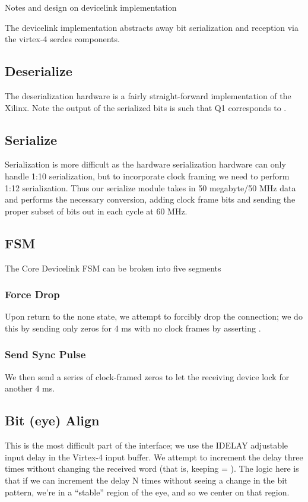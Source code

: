 Notes and design on devicelink implementation

The devicelink implementation abstracts away bit serialization and reception via the virtex-4 serdes components. 

\subsection{Deserialize}
The deserialization hardware is a fairly straight-forward implementation of the Xilinx. Note the output of the serialized bits is such that Q1 corresponds to . 

\subsection{Serialize}
Serialization is more difficult as the hardware serialization hardware
can only handle 1:10 serialization, but to incorporate clock framing
we need to perform 1:12 serialization. Thus our serialize module takes
in 50 megabyte/50 MHz data and performs the necessary conversion,
adding clock frame bits and sending the proper subset of bits out in
each cycle at 60 MHz.


\subsection{FSM} 
The Core Devicelink FSM can be broken into five segments

\subsubsection{Force Drop}
Upon return to the none state, we attempt to forcibly drop the
connection; we do this by sending only zeros for 4 ms with no clock
frames by asserting .

\subsubsection{Send Sync Pulse}
We then send a series of clock-framed zeros to let the receiving
device lock for another 4 ms.

\subsection{Bit (eye) Align}
This is the most difficult part of the interface; we use the IDELAY
adjustable input delay in the Virtex-4 input buffer. We attempt to
increment the delay three times without changing the received word
(that is, keeping  = ). The logic
here is that if we can increment the delay N times without seeing
a change in the bit pattern, we're in a ``stable'' region of the eye, and
so we center on that region. 

